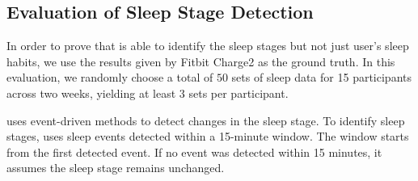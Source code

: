 \subsection{Evaluation of Sleep Stage Detection\label{sec:overall_per}}
In order to prove that \systemname is able to identify the sleep stages but not just user's sleep habits, we use the results given by
Fitbit Charge2 as the ground truth. In this evaluation, we randomly choose a total of $50$ sets  of sleep data for 15 participants across
two weeks, yielding at least $3$ sets per participant.

{\systemname} uses event-driven methods to  detect changes in the sleep stage. To identify sleep stages, \systemname uses sleep events
detected within a 15-minute window. The window starts from the first detected event. If no event was detected within 15 minutes, it assumes
the sleep stage remains unchanged.

